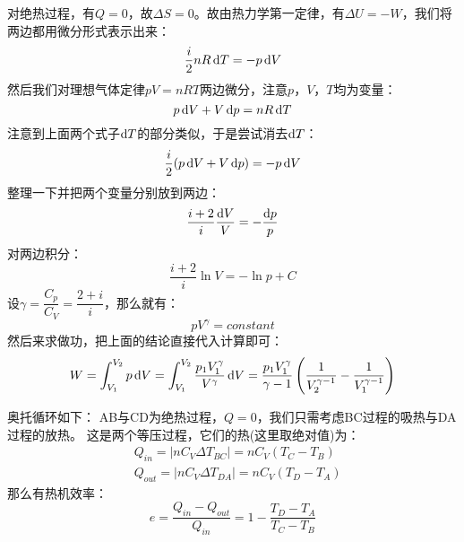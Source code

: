        \begin{prove}
            对绝热过程，有$Q = 0$，故$\Delta S = 0$。故由热力学第一定律，有$\Delta U = -W$，我们将两边都用微分形式表示出来：
            \begin{equation}
                \frac{i}{2}nR\dif{T} = -p\dif{V} 
                \nonumber
            \end{equation}
            然后我们对理想气体定律$pV = nRT$两边微分，注意$p$，$V$，$T$均为变量：
            \begin{equation}
                p\dif{V} + V\dif{p} = nR \dif{T}
                \nonumber
            \end{equation}
            注意到上面两个式子$\dif{T}$的部分类似，于是尝试消去$\dif{T}$：
            \begin{equation}
                \frac{i}{2} (p\dif{V} + V\dif{p}) = -p\dif{V}
                \nonumber
            \end{equation}
            整理一下并把两个变量分别放到两边：
            \begin{equation}
                \frac{i+2}{i} \frac{\dif{V}}{V}  = -\frac{\dif{p}}{p}
                \nonumber
            \end{equation}
            对两边积分：
            \begin{equation}
                \frac{i+2}{i} \ln V  =-\ln p + C
                \nonumber
            \end{equation}
            设$\gamma = \dfrac{C_p}{C_V} = \dfrac{2+i}{i}$，那么就有：
            \begin{equation}
                pV^{\gamma} = constant
            \end{equation}
            然后来求做功，把上面的结论直接代入计算即可：
            \begin{equation}
                W = \int_{V_1}^{V_2} p\dif{V} =\int_{V_1}^{V_2} \frac{p_{1}V_{1}^{\gamma}}{V^{\gamma}}\dif{V}
                  = \frac{p_{1}V_{1}^{\gamma}}{\gamma - 1}\left(\frac{1}{V_{2}^{\gamma-1}}-\frac{1}{V_1^{\gamma-1}}\right)
            \end{equation}
        \end{prove}
        \begin{prove}
            奥托循环如下：
            AB与CD为绝热过程，$Q = 0$，我们只需考虑BC过程的吸热与DA过程的放热。
            这是两个等压过程，它们的热(这里取绝对值)为：
            \begin{equation}
                \begin{aligned}
                    &Q_{in}  = |nC_{V}\Delta T_{BC}|= nC_{V}(T_{C} - T_{B})\\
                    &Q_{out} = |nC_{V}\Delta T_{DA}|= nC_{V}(T_{D} - T_{A})
                \end{aligned}
                \nonumber
            \end{equation}
            那么有热机效率：
            \begin{equation}
                e = \frac{Q_{in}-Q_{out}}{Q_{in}} = 1 - \frac{T_{D} - T_{A}}{T_{C} - T_{B}}
            \end{equation}
        \end{prove}
